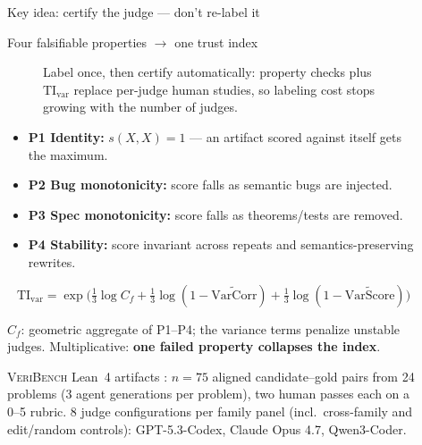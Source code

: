 \documentclass[final]{beamer}
\newlength{\sepwidth}
\newlength{\colwidth}
\newcommand{\separatorcolumn}{\begin{column}{\sepwidth}\end{column}}
\newcommand{\tivar}{\ensuremath{\mathrm{TI}_{\mathrm{var}}}}
\begin{document}
\begin{frame}[t]
\begin{columns}[t]
\begin{column}{\colwidth}
\begin{alertblock}{Key idea: certify the judge --- don't re-label it}
  \end{alertblock}

  \begin{block}{Four falsifiable properties $\rightarrow$ one trust index}

    \begin{figure}
      \centering
      \resizebox{0.86\linewidth}{!}{}
      \caption{Label once, then certify automatically: property checks plus \tivar{} replace per-judge human studies, so labeling cost stops growing with the number of judges.}
    \end{figure}

    \begin{itemize}
      \item \textbf{P1 Identity:} $s(X,X)=1$ --- an artifact scored against itself gets the maximum.
      \item \textbf{P2 Bug monotonicity:} score falls as semantic bugs are injected.
      \item \textbf{P3 Spec monotonicity:} score falls as theorems/tests are removed.
      \item \textbf{P4 Stability:} score invariant across repeats and semantics-preserving rewrites.
    \end{itemize}

    \[
      \tivar = \exp\!\Big(
      \tfrac{1}{3}\log C_f
      + \tfrac{1}{3}\log(1-\widetilde{\mathrm{VarCorr}})
      + \tfrac{1}{3}\log(1-\widetilde{\mathrm{VarScore}})
      \Big)
    \]

    $C_f$: geometric aggregate of P1--P4; the variance terms penalize unstable judges. Multiplicative: \textbf{one failed property collapses the index}.

    \textsc{VeriBench} Lean~4 artifacts \cite{anonymous2026veribench}: $n{=}75$ aligned candidate--gold pairs from 24 problems (3 agent generations per problem), two human passes each on a 0--5 rubric. 8 judge configurations per family panel (incl.\ cross-family and edit/random controls): GPT-5.3-Codex, Claude Opus 4.7, Qwen3-Coder.

  \end{block}

\end{column}

\separatorcolumn

\begin{column}{\colwidth}


\end{column}
\end{columns}
\end{frame}
\end{document}
